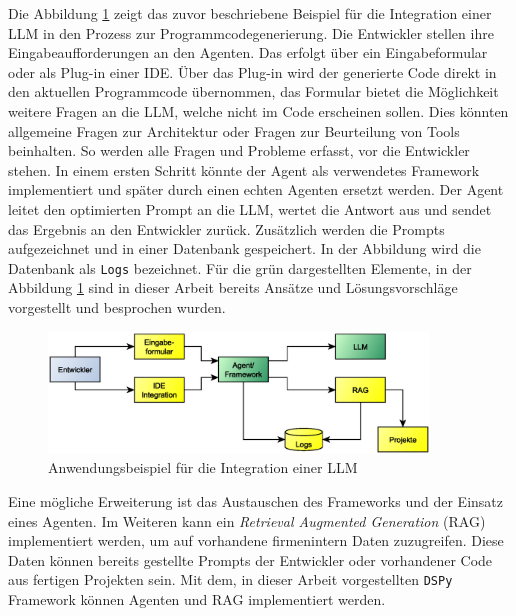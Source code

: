Die Abbildung \ref{img:example_firm_integration} zeigt das zuvor beschriebene Beispiel für die Integration einer LLM in den Prozess zur Programmcodegenerierung. Die Entwickler stellen ihre Eingabeaufforderungen an den Agenten. Das erfolgt über ein Eingabeformular oder als Plug-in einer IDE. Über das Plug-in wird der generierte Code direkt in den aktuellen Programmcode übernommen, das Formular bietet die Möglichkeit weitere Fragen an die LLM, welche nicht im Code erscheinen sollen. Dies könnten allgemeine Fragen zur Architektur oder Fragen zur Beurteilung von Tools beinhalten. So werden alle Fragen und Probleme erfasst, vor die Entwickler stehen.
In einem ersten Schritt könnte der Agent als verwendetes Framework implementiert und später durch einen echten Agenten ersetzt werden. Der Agent leitet den optimierten Prompt an die LLM, wertet die Antwort aus und sendet das Ergebnis an den Entwickler zurück. Zusätzlich werden die Prompts aufgezeichnet und in einer Datenbank gespeichert. In der Abbildung wird die Datenbank als \texttt{Logs} bezeichnet. Für die grün dargestellten Elemente, in der Abbildung \ref{img:example_firm_integration} sind in dieser Arbeit bereits Ansätze und Lösungsvorschläge vorgestellt und besprochen wurden.\vspace{0.2cm}

\begin{figure}[!ht]
	\includegraphics[width=0.9\textwidth]{content/chapter_discussion/images/anwendungsbeispiel.eps}
	\centering
	\caption{Anwendungsbeispiel für die Integration einer LLM}
	\label{img:example_firm_integration}
\end{figure}

Eine mögliche Erweiterung ist das Austauschen des Frameworks und der Einsatz eines Agenten. Im Weiteren kann ein \textit{Retrieval Augmented Generation} (\acrshort{RAG}) implementiert werden, um auf vorhandene firmenintern Daten zuzugreifen. Diese Daten können bereits gestellte Prompts der Entwickler oder vorhandener Code aus fertigen Projekten sein. Mit dem, in dieser Arbeit vorgestellten \texttt{DSPy} Framework können Agenten und RAG implementiert werden.\vspace{0.2cm}

